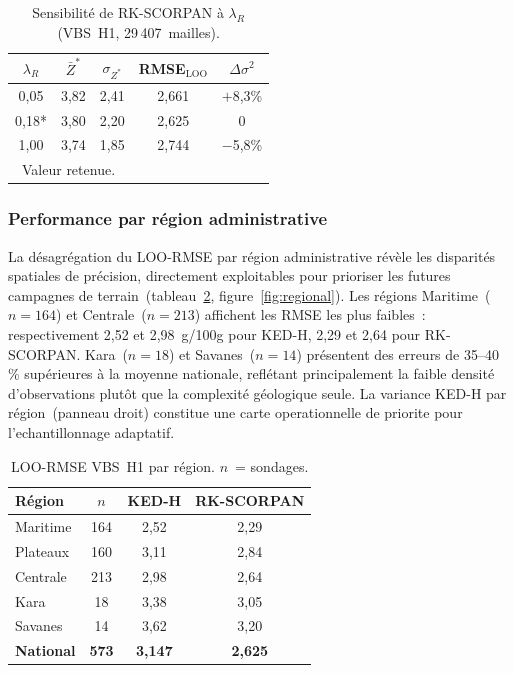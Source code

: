 \documentclass[10pt,a4paper,twocolumn]{article}
\begin{document}
	\begin{table}[htbp]
		\centering\small
		\caption{Sensibilité de RK-SCORPAN à $\lambda_R$
			(VBS~H1, 29\,407~mailles).}
		\label{tab:sensibilite_ridge}
		\begin{tabular}{ccccc}
			\toprule
			$\lambda_R$ & $\bar{Z}^*$ & $\sigma_{Z^*}$ & RMSE$_{\mathrm{LOO}}$ & $\Delta\sigma^2$ \\
			\midrule
			0,05  & 3,82 & 2,41 & 2,661 & $+$8,3\% \\
			0,18* & 3,80 & 2,20 & 2,625 & 0        \\
			1,00  & 3,74 & 1,85 & 2,744 & $-$5,8\% \\
			\bottomrule
			\multicolumn{5}{l}{\small *~Valeur retenue.}
		\end{tabular}
	\end{table}
	
	\subsubsection{Performance par région administrative}

	La désagrégation du LOO-RMSE par région administrative
	révèle les disparités spatiales de précision,
	directement exploitables pour prioriser les futures
	campagnes de terrain~(tableau~\ref{tab:perf_region},
	figure~\ref{fig:regional}).
	Les régions Maritime~($n=164$) et Centrale~($n=213$)
	affichent les RMSE les plus faibles~: respectivement
	2{,}52 et 2{,}98~g/100g pour KED-H, 2{,}29 et 2{,}64
	pour RK-SCORPAN.
	Kara~($n=18$) et Savanes~($n=14$) présentent des
	erreurs de 35--40\,\% supérieures à la moyenne nationale,
	reflétant principalement la faible densité d'observations
	plutôt que la complexité géologique seule.
	La variance KED-H par région~(panneau droit)
	constitue une carte operationnelle de priorite pour
	l'echantillonnage adaptatif.

	\begin{table}[htbp]
		\centering\small
		\caption{LOO-RMSE VBS~H1 par région. $n$~= sondages.}
		\label{tab:perf_region}
		\begin{tabular}{lccc}
			\toprule
			Région & $n$ & KED-H & RK-SCORPAN \\
			\midrule
			Maritime          & 164 & 2,52  & 2,29  \\
			Plateaux          & 160 & 3,11  & 2,84  \\
			Centrale          & 213 & 2,98  & 2,64  \\
			Kara              & 18  & 3,38  & 3,05  \\
			Savanes           & 14  & 3,62  & 3,20  \\
			\textbf{National} & \textbf{573} & \textbf{3,147} & \textbf{2,625} \\
			\bottomrule
		\end{tabular}
	\end{table}
	
\end{document}
